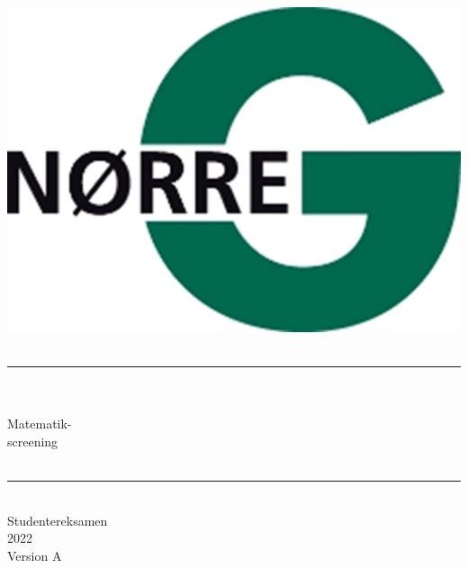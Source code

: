 \documentclass[12pt,x11names,a4paper]{article}
\begin{document}
%

\begin{titlepage}

\begin{minipage}{0.27\textwidth}

\end{minipage}
\begin{minipage}{0.73\textwidth}
\begin{center}
\phantom{h} \vspace{1cm}\\
\hspace{4cm}
\includegraphics[scale = 1]{Billeder/Norreg.png} \\
\phantom{h} \vspace{5cm}\\
\rule{0.7\textwidth}{0.3mm}\\
\phantom{h}\\
{\fontsize{50}{60}\selectfont Matematik-\\screening}\\
\phantom{h}\\
\rule{0.7\textwidth}{0.3mm}\\
\Large Studentereksamen\\
\Large 2022\\
\Large Version A

\end{center}
\end{minipage}
\end{titlepage}
\end{document}
